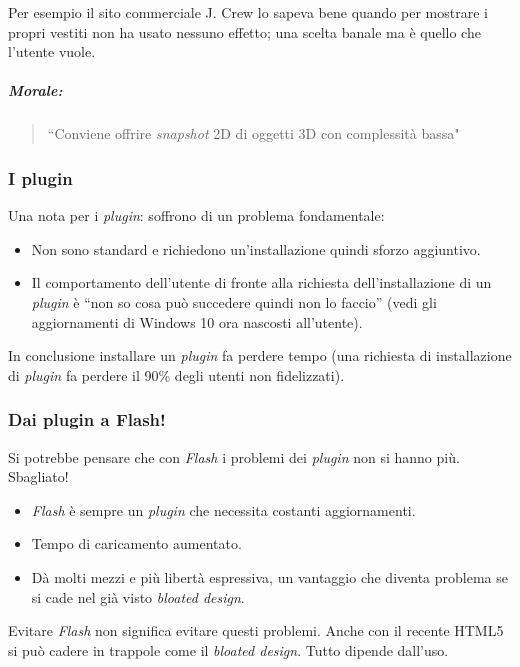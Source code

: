 				Per esempio il sito commerciale J. Crew lo sapeva bene quando per mostrare i propri vestiti non ha usato nessuno effetto; una scelta banale ma è quello che l'utente vuole.
				
				\subparagraph*{Morale:}
				\begin{quote}
					``Conviene offrire \emph{snapshot} 2D di oggetti 3D con complessità bassa"
				\end{quote}
				
			\subsubsection{I plugin}
				Una nota per i \emph{plugin}: soffrono di un problema fondamentale:
				\begin{itemize}
					\item Non sono standard e richiedono un'installazione quindi sforzo aggiuntivo.
					\item Il comportamento dell'utente di fronte alla richiesta dell'installazione di un \emph{plugin} è ``non so cosa può succedere quindi non lo faccio'' (vedi gli aggiornamenti di Windows 10 ora nascosti all'utente).
				\end{itemize}
				In conclusione installare un \emph{plugin} fa perdere tempo (una richiesta di installazione di \emph{plugin} fa perdere il 90\% degli utenti non fidelizzati).
			
			\subsubsection{Dai plugin a Flash!}
				Si potrebbe pensare che con \emph{Flash} i problemi dei \emph{plugin} non si hanno più. Sbagliato!
				\begin{itemize}
					\item \emph{Flash} è sempre un \emph{plugin} che necessita costanti aggiornamenti.
					\item Tempo di caricamento aumentato.
					\item Dà molti mezzi e più libertà espressiva, un vantaggio che diventa problema se si cade nel già visto \emph{bloated design}.
				\end{itemize}
				Evitare \emph{Flash} non significa evitare questi problemi. Anche con il recente HTML5 si può cadere in trappole come il \emph{bloated design}. Tutto dipende dall'uso.
			
